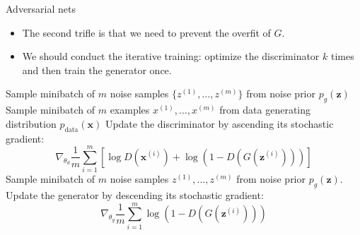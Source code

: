 \documentclass[10pt]{beamer}
\begin{document}
	\begin{frame}{Adversarial nets}
		\begin{itemize}
			\item The second trifle is that we need to prevent the overfit of $G$.
			\pause
			\item We should conduct the iterative training: optimize the discriminator $k$ times and then train the generator once. 
			\pause
		\end{itemize}
		\begin{algorithm}[H]
			\scriptsize
			\caption*{\textbf{Algorithm} \scriptsize Minibatch stochastic gradient descent training of generative adversarial nets.}
			\label{alg:train-gan}
			\begin{algorithmic}
				\pause
					\pause
						\pause
						\STATE Sample minibatch of $m$ noise samples $\{z^{(1)},\dots,z^{(m)}\}$ from noise prior $p_g(\bm{z})$
						\pause
						\STATE Sample minibatch of $m$ examples ${x^{(1)},\dots,x^{(m)}}$ from data generating distribution $p_{\text{data}}(\bm{x})$
						\pause
						\STATE Update the discriminator by ascending its stochastic gradient:
							\pause
							\vspace{-1em}
							$$
							\nabla_{\theta_{d}}\frac{1}{m}\sum^m_{i=1}\left[\log D\left(\bm{x}^{(i)}\right)+\log\left(1-D\left(G\left(\bm{z}^{(i)}\right)\right)\right)\right]
							$$
							\vspace{-1em}
					\ENDFOR
					\pause
					\STATE Sample minibatch of $m$ noise samples ${z^{(1)},\dots,z^{(m)}}$ from noise prior $p_g(\bm{z})$.
					\pause
					\STATE Update the generator by descending its stochastic gradient:
						\pause
						\vspace{-1em}
						$$
						\nabla_{\theta_{g}}\frac{1}{m}\sum_{i=1}^{m}\log\left(1-D\left(G\left(\bm{z}^{(i)}\right)\right)\right)
						$$
						\vspace{-1em}
				\ENDFOR
			\end{algorithmic}
		\end{algorithm}
	\end{frame}
\end{document}
